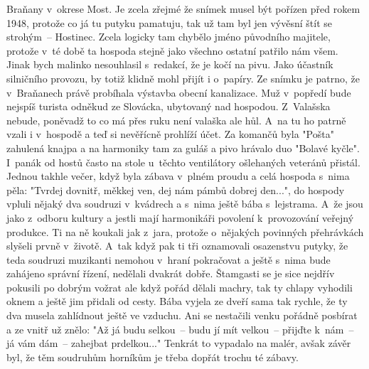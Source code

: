 
Braňany v~okrese Most. Je zcela zřejmé že snímek musel být pořízen
před rokem 1948, protože co já tu putyku pamatuju, tak už tam byl jen
vývěsní štít se strohým~-- Hostinec. Zcela logicky tam chybělo jméno
původního majitele, protože v~té době ta hospoda stejně jako všechno
ostatní patřilo nám všem. Jinak bych malinko nesouhlasil s~redakcí, že
je kočí na pivu. Jako účastník silničního provozu, by totiž klidně
mohl přijít i o~papíry. Ze snímku je patrno, že v~Braňanech právě
probíhala výstavba obecní kanalizace. Muž v~popředí bude nejspíš
turista odněkud ze Slovácka, ubytovaný nad hospodou. Z~Valašska
nebude, poněvadž to co má přes ruku není valaška ale hůl. A~na tu ho
patrně vzali i v~hospodě a teď si nevěřícně prohlíží účet. Za komančů
byla "Pošta" zahulená knajpa a na harmoniky tam za guláš a pivo
hrávalo duo "Bolavé kyčle". I~panák od hostů často na stole u~těchto
ventilátory ošlehaných veteránů přistál. Jednou takhle večer, když
byla zábava v~plném proudu a celá hospoda s~nima pěla: "Tvrdej
dovnitř, měkkej ven, dej nám pámbů dobrej den...", do hospody vpluli
nějaký dva soudruzi v~kvádrech a s~nima ještě bába s~lejstrama. A~že
jsou jako z~odboru kultury a jestli mají harmonikáři povolení
k~provozování veřejný produkce. Ti na ně koukali jak z~jara, protože
o~nějakých povinných přehrávkách slyšeli prvně v~životě. A~tak když pak
ti tři oznamovali osazenstvu putyky, že teda soudruzi muzikanti
nemohou v~hraní pokračovat a ještě s~nima bude zahájeno správní
řízení, nedělali dvakrát dobře. Štamgasti se je sice nejdřív pokusili
po dobrým vožrat ale když pořád dělali machry, tak ty chlapy vyhodili
oknem a ještě jim přidali od cesty. Bába vyjela ze dveří sama tak
rychle, že ty dva musela zahlídnout ještě ve vzduchu. Ani se nestačili
venku pořádně posbírat a ze vnitř už znělo: "Až já budu selkou~-- budu
jí mít velkou~-- přijďte k~nám~-- já vám dám~-- zahejbat prdelkou..."
Tenkrát to vypadalo na malér, avšak závěr byl, že těm soudruhům
horníkům je třeba dopřát trochu té zábavy.

